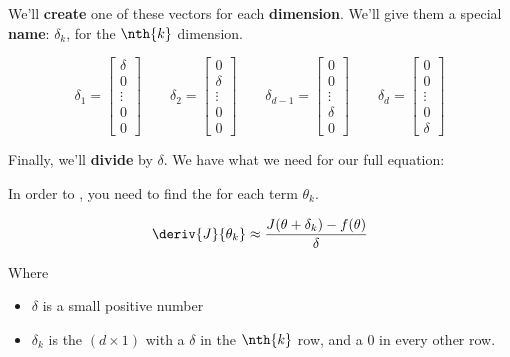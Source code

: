         We'll \textbf{create} one of these vectors for each \textbf{dimension}. We'll give them a special \textbf{name}: $\delta_k$, for the $\nth{k}$ dimension.
        
        \begin{equation}
            \delta_1 
            = 
            \begin{bmatrix}
                \delta \\ 0 \\ \vdots\\ 0 \\ 0
            \end{bmatrix}
            \qquad
            \delta_2 
            = 
            \begin{bmatrix}
                0 \\ \delta \\ \vdots\\ 0 \\ 0
            \end{bmatrix}
            \qquad
            \delta_{d-1} 
            = 
            \begin{bmatrix}
                0 \\ 0 \\ \vdots\\ \delta \\ 0
            \end{bmatrix}
            \qquad
            \delta_{d} 
            = 
            \begin{bmatrix}
                0 \\ 0 \\ \vdots\\ 0 \\ \delta
            \end{bmatrix}
        \end{equation}
        
        Finally, we'll \textbf{divide} by $\delta$. We have what we need for our full equation:\\
        
        \begin{kequation}
            In order to , you need to find the  for each term $\theta_k$.
            
            \begin{equation*}
                \deriv{J}{\theta_k} \approx
                \frac{J(\theta+\delta_k)-f(\theta)}{\delta}
            \end{equation*}
            
            Where 
            
            \begin{itemize}
                \item $\delta$ is a small positive number
                \item $\delta_k$ is the $(d \times 1)$  with a $\delta$ in the $\nth{k}$ row, and a 0 in every other row.
            \end{itemize} 
        \end{kequation}